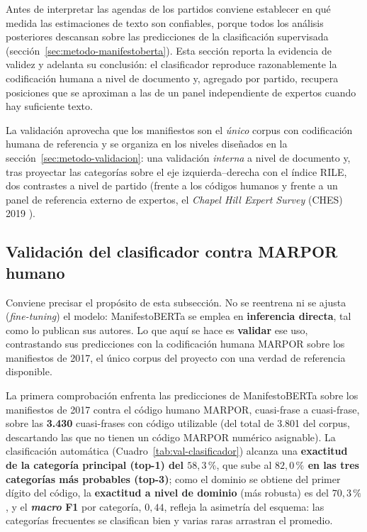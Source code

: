 Antes de interpretar las agendas de los partidos conviene establecer en qué
medida las estimaciones de texto son confiables, porque todos los análisis
posteriores descansan sobre las predicciones de la clasificación supervisada
(sección~\ref{sec:metodo-manifestoberta}). Esta sección reporta la evidencia de
validez y adelanta su conclusión: el clasificador reproduce razonablemente la
codificación humana a nivel de documento y, agregado por partido, recupera
posiciones que se aproximan a las de un panel independiente de expertos cuando
hay suficiente texto.

La validación aprovecha que los manifiestos son el \emph{único} corpus con
codificación humana de referencia y se organiza en los niveles diseñados en la
sección~\ref{sec:metodo-validacion}: una validación \emph{interna} a nivel de
documento y, tras proyectar las categorías sobre el eje izquierda--derecha con el
índice RILE, dos contrastes a nivel de partido (frente a los códigos humanos y
frente a un panel de referencia externo de expertos, el \emph{Chapel Hill Expert
Survey} (CHES) 2019 \cite{jolly2022ches, ches2019data}).

\subsection{Validación del clasificador contra MARPOR humano}
\label{sec:res-val-clasificador}

Conviene precisar el propósito de esta subsección. No se reentrena ni se ajusta
(\emph{fine-tuning}) el modelo: ManifestoBERTa se emplea en \textbf{inferencia
directa}, tal como lo publican sus autores. Lo que aquí se hace es \textbf{validar}
ese uso, contrastando sus predicciones con la codificación humana MARPOR sobre los
manifiestos de 2017, el único corpus del proyecto con una verdad de referencia
disponible.

La primera comprobación enfrenta las predicciones de ManifestoBERTa
\cite{manifestoberta2024} sobre los manifiestos de 2017 contra el código humano
MARPOR, cuasi-frase a cuasi-frase, sobre las \textbf{3.430} cuasi-frases con
código utilizable (del total de 3.801 del corpus, descartando las que no tienen
un código MARPOR numérico asignable). La clasificación automática
(Cuadro~\ref{tab:val-clasificador}) alcanza una \textbf{exactitud de la categoría
principal (top-1) del $58{,}3\,\%$}, que sube al \textbf{$82{,}0\,\%$ en las tres
categorías más probables (top-3)}; como el dominio se obtiene del primer dígito
del código, la \textbf{exactitud a nivel de dominio} (más robusta) es del
\textbf{$70{,}3\,\%$}, y el \textbf{\emph{macro} F1} por categoría, $0{,}44$,
refleja la asimetría del esquema: las categorías frecuentes se clasifican bien y
varias raras arrastran el promedio.

